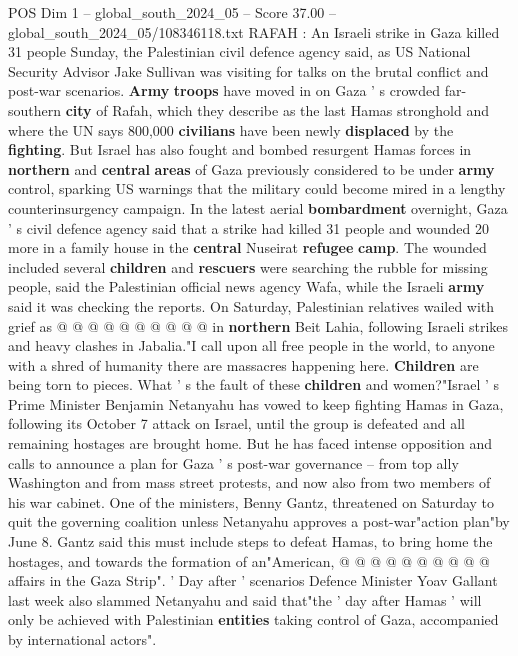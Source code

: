 \begin{textsample}{POS Dim 1 – global\_south\_2024\_05 – Score 37.00 – global\_south\_2024\_05/108346118.txt}  \label{ex:f1_pos_075}
RAFAH : An Israeli strike in Gaza killed 31 people Sunday, the Palestinian civil defence agency said, as US National Security Advisor Jake Sullivan was visiting for talks on the brutal conflict and post-war scenarios. \textbf{Army} \textbf{troops} have moved in on Gaza ' s crowded far-southern \textbf{city} of Rafah, which they describe as the last Hamas stronghold and where the UN says 800,000 \textbf{civilians} have been newly \textbf{displaced} by the \textbf{fighting}.
But Israel has also fought and bombed resurgent Hamas forces in \textbf{northern} and \textbf{central} \textbf{areas} of Gaza previously considered to be under \textbf{army} control, sparking US warnings that the military could become mired in a lengthy counterinsurgency campaign.
In the latest aerial \textbf{bombardment} overnight, Gaza ' s civil defence agency said that a strike had killed 31 people and wounded 20 more in a family house in the \textbf{central} Nuseirat \textbf{refugee} \textbf{camp}.
The wounded included several \textbf{children} and \textbf{rescuers} were searching the rubble for missing people, said the Palestinian official news agency Wafa, while the Israeli \textbf{army} said it was checking the reports.
On Saturday, Palestinian relatives wailed with grief as @ @ @ @ @ @ @ @ @ @ in \textbf{northern} Beit Lahia, following Israeli strikes and heavy clashes in Jabalia."I call upon all free people in the world, to anyone with a shred of humanity there are massacres happening here. \textbf{Children} are being torn to pieces.
What ' s the fault of these \textbf{children} and women?"Israel ' s Prime Minister Benjamin Netanyahu has vowed to keep fighting Hamas in Gaza, following its October 7 attack on Israel, until the group is defeated and all remaining hostages are brought home.
But he has faced intense opposition and calls to announce a plan for Gaza ' s post-war governance -- from top ally Washington and from mass street protests, and now also from two members of his war cabinet.
One of the ministers, Benny Gantz, threatened on Saturday to quit the governing coalition unless Netanyahu approves a post-war"action plan"by June 8.
Gantz said this must include steps to defeat Hamas, to bring home the hostages, and towards the formation of an"American, @ @ @ @ @ @ @ @ @ @ affairs in the Gaza Strip". ' Day after ' scenarios Defence Minister Yoav Gallant last week also slammed Netanyahu and said that"the ' day after Hamas ' will only be achieved with Palestinian \textbf{entities} taking control of Gaza, accompanied by international actors".

\end{textsample}
